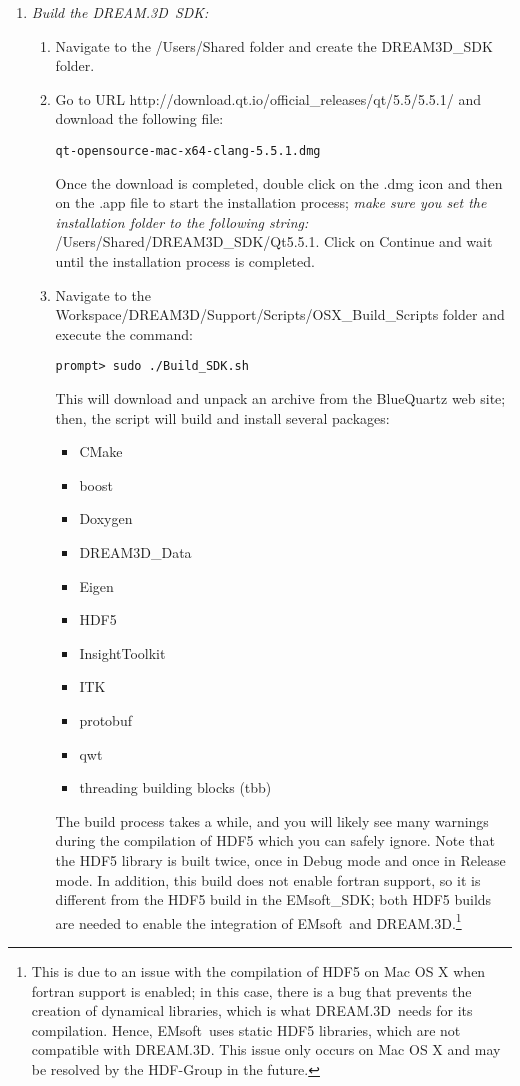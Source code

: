 \documentclass[11pt]{amsart}
\newcommand{\ems}{\textsf{EMsoft}}
\newcommand{\emsdk}{\textsf{EMsoft\_SDK}}
\newcommand{\dtd}{\textsf{DREAM.3D}}
\begin{document}
\begin{enumerate}
\item \textit{Build the \dtd\ SDK:}
\begin{enumerate}
\item Navigate to the \textsf{/Users/Shared} folder and create the \textsf{DREAM3D\_SDK} folder.
\item Go to URL \textsf{http://download.qt.io/official\_releases/qt/5.5/5.5.1/} and download the 
following file:
{\small\begin{verbatim}
qt-opensource-mac-x64-clang-5.5.1.dmg
\end{verbatim}}
Once the download is completed, double click on the .dmg icon and then on the .app file to start the installation process; \textit{make sure
you set the installation folder to the following string:} \textsf{/Users/Shared/DREAM3D\_SDK/Qt5.5.1}.  Click on Continue and wait
until the installation process is completed.
\item Navigate to the \textsf{Workspace/DREAM3D/Support/Scripts/OSX\_Build\_Scripts} folder and execute the command:
{\small
\begin{verbatim}
prompt> sudo ./Build_SDK.sh
\end{verbatim}}
This will download and unpack an archive from the BlueQuartz web site; then, the script will build and install several packages:
\begin{itemize}
\item CMake
\item boost
\item Doxygen
\item DREAM3D\_Data
\item Eigen
\item HDF5
\item InsightToolkit
\item ITK
\item protobuf
\item qwt
\item threading building blocks (tbb)
\end{itemize}
The build process takes a while, and you will likely see many warnings during the compilation of HDF5 which you can safely ignore.  Note that the 
HDF5 library is built twice, once in Debug mode and once in Release mode.  In addition, this build does not enable fortran support, so it is different
from the HDF5 build in the \emsdk; both HDF5 builds are needed to enable the integration of \ems\ and \dtd.\footnote{This is due to an issue with 
the compilation of HDF5 on Mac OS X when fortran support is enabled; in this case, there is a bug that prevents the creation of dynamical libraries,
which is what \dtd\ needs for its compilation.  Hence, \ems\ uses static HDF5 libraries, which are not compatible with \dtd.  This issue only occurs on 
Mac OS X and may be resolved by the HDF-Group in the future.}
\end{enumerate}


\end{enumerate}
\end{document}
